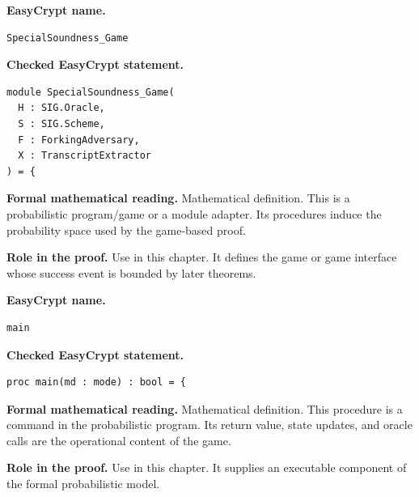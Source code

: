 \begin{formaldefinition}
\noindent\textbf{EasyCrypt name.}
\begin{lstlisting}[language=EasyCrypt,basicstyle=\ttfamily\scriptsize]
SpecialSoundness_Game
\end{lstlisting}
\noindent\textbf{Checked EasyCrypt statement.}
\begin{lstlisting}[language=EasyCrypt,basicstyle=\ttfamily\scriptsize]
module SpecialSoundness_Game(
  H : SIG.Oracle,
  S : SIG.Scheme,
  F : ForkingAdversary,
  X : TranscriptExtractor
) = {
\end{lstlisting}
\noindent\textbf{Formal mathematical reading.}
Mathematical definition. This is a probabilistic program/game or a module adapter.  Its procedures induce the probability space used by the game-based proof.

\noindent\textbf{Role in the proof.}
Use in this chapter. It defines the game or game interface whose success event is bounded by later theorems.

\end{formaldefinition}

\begin{formaldefinition}
\noindent\textbf{EasyCrypt name.}
\begin{lstlisting}[language=EasyCrypt,basicstyle=\ttfamily\scriptsize]
main
\end{lstlisting}
\noindent\textbf{Checked EasyCrypt statement.}
\begin{lstlisting}[language=EasyCrypt,basicstyle=\ttfamily\scriptsize]
proc main(md : mode) : bool = {
\end{lstlisting}
\noindent\textbf{Formal mathematical reading.}
Mathematical definition. This procedure is a command in the probabilistic program.  Its return value, state updates, and oracle calls are the operational content of the game.

\noindent\textbf{Role in the proof.}
Use in this chapter. It supplies an executable component of the formal probabilistic model.

\end{formaldefinition}

